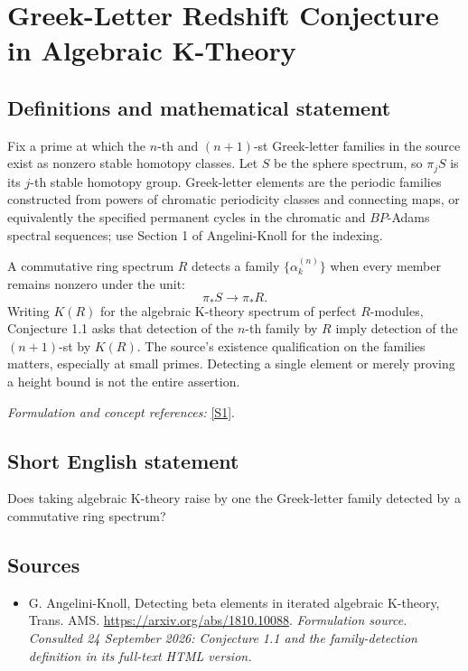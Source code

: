 \documentclass[11pt]{article}
\begin{document}
\section*{\texorpdfstring{Greek-Letter Redshift Conjecture in Algebraic K-Theory}{Greek-Letter Redshift Conjecture in Algebraic K-Theory}}\label{453}
\subsection{Definitions and mathematical statement}
Fix a prime at which the $n$-th and $(n+1)$-st Greek-letter families in the source exist as nonzero stable homotopy classes. Let $S$ be the sphere spectrum, so $\pi_jS$ is its $j$-th stable homotopy group. Greek-letter elements are the periodic families constructed from powers of chromatic periodicity classes and connecting maps, or equivalently the specified permanent cycles in the chromatic and $BP$-Adams spectral sequences; use Section 1 of Angelini-Knoll for the indexing.

A commutative ring spectrum $R$ detects a family $\{\alpha_k^{(n)}\}$ when every member remains nonzero under the unit:
\[
 \pi_*S\longrightarrow\pi_*R.
\]
Writing $K(R)$ for the algebraic K-theory spectrum of perfect $R$-modules, Conjecture 1.1 asks that detection of the $n$-th family by $R$ imply detection of the $(n+1)$-st by $K(R)$. The source's existence qualification on the families matters, especially at small primes. Detecting a single element or merely proving a height bound is not the entire assertion.
\par\smallskip\textit{Formulation and concept references:} \href{https://arxiv.org/abs/1810.10088}{[S1]}.

\subsection{Short English statement}
Does taking algebraic K-theory raise by one the Greek-letter family detected by a commutative ring spectrum?
\subsection{Sources}
\begin{itemize}
\item[S1]G. Angelini-Knoll, Detecting beta elements in iterated algebraic K-theory, Trans. AMS.
\url{https://arxiv.org/abs/1810.10088}.
\textit{Formulation source. Consulted 24 September 2026: Conjecture 1.1 and the family-detection definition in its full-text HTML version.}
\end{itemize}
\end{document}

